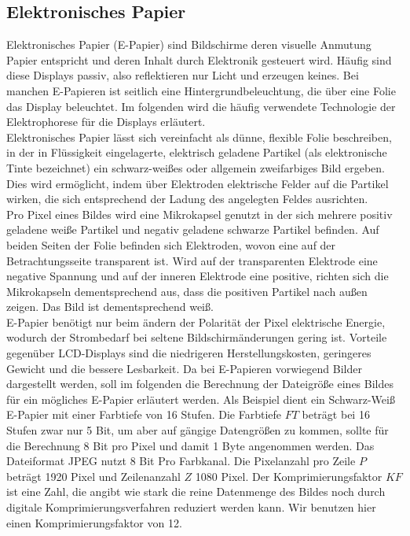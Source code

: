 \subsection{Elektronisches Papier}
Elektronisches Papier (E-Papier) sind Bildschirme deren visuelle Anmutung Papier entspricht und deren Inhalt durch Elektronik gesteuert wird. Häufig sind diese Displays passiv, also reflektieren nur Licht und erzeugen keines. Bei manchen E-Papieren ist seitlich eine Hintergrundbeleuchtung, die über eine Folie das Display beleuchtet. Im folgenden wird die häufig verwendete Technologie der Elektrophorese für die Displays erläutert. \\
\glqq Elektronisches Papier lässt sich vereinfacht als dünne, flexible Folie beschreiben, in der in Flüssigkeit eingelagerte, elektrisch geladene Partikel (als elektronische Tinte bezeichnet) ein schwarz-weißes oder allgemein zweifarbiges Bild ergeben. Dies wird ermöglicht, indem über Elektroden elektrische Felder auf die Partikel wirken, die sich entsprechend der Ladung des angelegten Feldes ausrichten. \grqq \cite[Seite 568]{Schryen.2002} \\
Pro Pixel eines Bildes wird eine Mikrokapsel genutzt in der sich mehrere positiv geladene weiße Partikel und negativ geladene schwarze Partikel befinden. Auf beiden Seiten der Folie befinden sich Elektroden, wovon eine auf der Betrachtungsseite transparent ist. Wird auf der transparenten Elektrode eine negative Spannung und auf der inneren Elektrode eine positive, richten sich die Mikrokapseln dementsprechend aus, dass die positiven Partikel nach außen zeigen. Das Bild ist dementsprechend weiß. \cite[Vgl. Seite 567 f.]{Schryen.2002} \\
E-Papier benötigt nur beim ändern der Polarität der Pixel elektrische Energie, wodurch der Strombedarf bei seltene Bildschirmänderungen gering ist.
Vorteile gegenüber LCD-Displays sind die niedrigeren Herstellungskosten, geringeres Gewicht und die bessere Lesbarkeit. \cite[Vgl. Seite 569]{Schryen.2002}
Da bei E-Papieren vorwiegend Bilder dargestellt werden, soll im folgenden die Berechnung der Dateigröße eines Bildes für ein mögliches E-Papier erläutert werden.
Als Beispiel dient ein Schwarz-Weiß E-Papier mit einer Farbtiefe von 16 Stufen. Die Farbtiefe $ FT $ beträgt bei 16 Stufen zwar nur 5 Bit, um aber auf gängige Datengrößen zu kommen, sollte für die Berechnung 8 Bit pro Pixel und damit 1 Byte angenommen werden. Das Dateiformat JPEG  nutzt 8 Bit Pro Farbkanal. Die Pixelanzahl pro Zeile $ P $ beträgt 1920 Pixel und Zeilenanzahl $ Z $ 1080 Pixel. Der Komprimierungsfaktor $ KF $ ist eine Zahl, die angibt wie stark die reine Datenmenge des Bildes noch durch digitale Komprimierungsverfahren reduziert werden kann. Wir benutzen hier einen Komprimierungsfaktor von 12. \cite[Vgl. Seite 22]{Buhler.2018}
